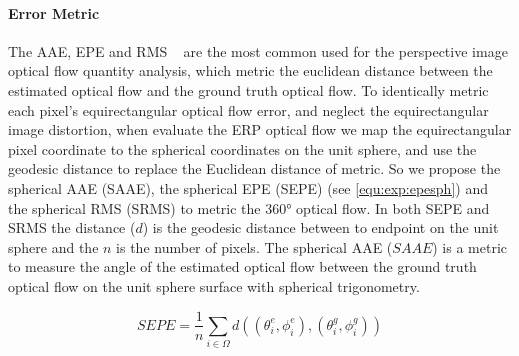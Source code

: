 \paragraph{Error Metric}
%
The AAE, EPE and RMS ~\cite{BakerSLRBS2011} are the most common used for the perspective image optical flow quantity analysis, which metric the euclidean distance between the estimated optical flow and the ground truth optical flow.
To identically metric each pixel's equirectangular optical flow error, and neglect the equirectangular image distortion, when evaluate the ERP optical flow we map the equirectangular pixel coordinate to the spherical coordinates on the unit sphere, and use the geodesic distance to replace the Euclidean distance of metric. 
%
So we propose the spherical AAE (SAAE), the spherical EPE (SEPE) (see \cref{equ:exp:epesph}) and the spherical RMS (SRMS) to metric the 360° optical flow.
In both SEPE and SRMS the distance ($d$) is the geodesic distance between to endpoint on the unit sphere and the $n$ is the number of pixels.
The spherical AAE ($SAAE$) is a metric to measure the angle of the estimated optical flow between the ground truth optical flow on the unit sphere surface with spherical trigonometry.

\begin{equation}\label{equ:exp:epesph}
	{SEPE} = \frac{1}{n} \sum_{i \in \Omega} d\left( (\theta^e_i,\phi^e_i), (\theta^g_i,\phi^g_i)\right) 
\end{equation}



